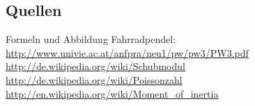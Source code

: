 \documentclass[12pt,a4paper]{article}
\begin{document}
\begin{multicols}{2}
\section{Quellen}
Formeln und Abbildung Fahrradpendel:\\
\url{http://www.univie.ac.at/anfpra/neu1/pw/pw3/PW3.pdf}\\
\url{http://de.wikipedia.org/wiki/Schubmodul}\\
\url{http://de.wikipedia.org/wiki/Poissonzahl}\\
\url{http://en.wikipedia.org/wiki/Moment_of_inertia}\\

\end{multicols}
\end{document}
